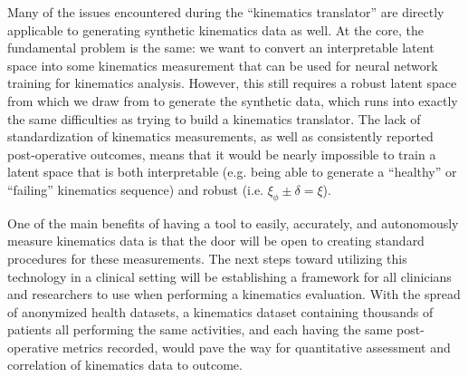 Many of the issues encountered during the ``kinematics translator'' are directly applicable to generating synthetic kinematics data as well.
At the core, the fundamental problem is the same: we want to convert an interpretable latent space into some kinematics measurement that can be used for neural network training for kinematics analysis.
However, this still requires a robust latent space from which we draw from to generate the synthetic data, which runs into exactly the same difficulties as trying to build a kinematics translator.
The lack of standardization of kinematics measurements, as well as consistently reported post-operative outcomes, means that it would be nearly impossible to train a latent space that is both interpretable (e.g. being able to generate a ``healthy'' or ``failing'' kinematics sequence) and robust (i.e. $\xi_{\phi} \pm \delta = \xi$).

One of the main benefits of having a tool to easily, accurately, and autonomously measure kinematics data is that the door will be open to creating standard procedures for these measurements.
The next steps toward utilizing this technology in a clinical setting will be establishing a framework for all clinicians and researchers to use when performing a kinematics evaluation.
With the spread of anonymized health datasets, a kinematics dataset containing thousands of patients all performing the same activities, and each having the same post-operative metrics recorded, would pave the way for quantitative assessment and correlation of kinematics data to outcome.
